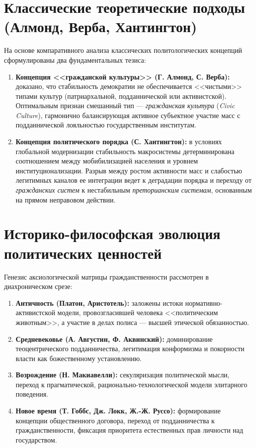 \documentclass[14pt,a4paper]{extarticle}
\begin{document}
\section{Классические теоретические подходы (Алмонд, Верба, Хантингтон)}
На основе компаративного анализа классических политологических концепций сформулированы два фундаментальных тезиса:
\begin{enumerate}
    \item \textbf{Концепция <<гражданской культуры>> (Г. Алмонд, С. Верба):} доказано, что стабильность демократии не обеспечивается <<чистыми>> типами культур (патриархальной, подданнической или активистской). Оптимальным признан смешанный тип --- \textit{гражданская культура} (\textit{Civic Culture}), гармонично балансирующая активное субъектное участие масс с подданнической лояльностью государственным институтам.
    \item \textbf{Концепция политического порядка (С. Хантингтон):} в условиях глобальной модернизации стабильность макросистемы детерминирована соотношением между мобибилизацией населения и уровнем институционализации. Разрыв между ростом активности масс и слабостью легитимных каналов ее интеграции ведет к деградации порядка и переходу от \textit{гражданских систем} к нестабильным \textit{преторианским системам}, основанным на прямом неправовом действии.
\end{enumerate}

\section{Историко-философская эволюция политических ценностей}
Генезис аксиологической матрицы гражданственности рассмотрен в диахроническом срезе:
\begin{enumerate}
    \item \textbf{Античность (Платон, Аристотель):} заложены истоки нормативно-активистской модели, провозгласившей человека <<политическим животным>>, а участие в делах полиса --- высшей этической обязанностью.
    \item \textbf{Средневековье (А. Августин, Ф. Аквинский):} доминирование теоцентрического подданничества, легитимация конформизма и покорности власти как божественному установлению.
    \item \textbf{Возрождение (Н. Макиавелли):} секуляризация политической мысли, переход к прагматической, рационально-технологической модели элитарного поведения.
    \item \textbf{Новое время (Т. Гоббс, Дж. Локк, Ж.-Ж. Руссо):} формирование концепции общественного договора, переход от подданничества к гражданственности, фиксация приоритета естественных прав личности над государством.
\end{enumerate}
\end{document}
